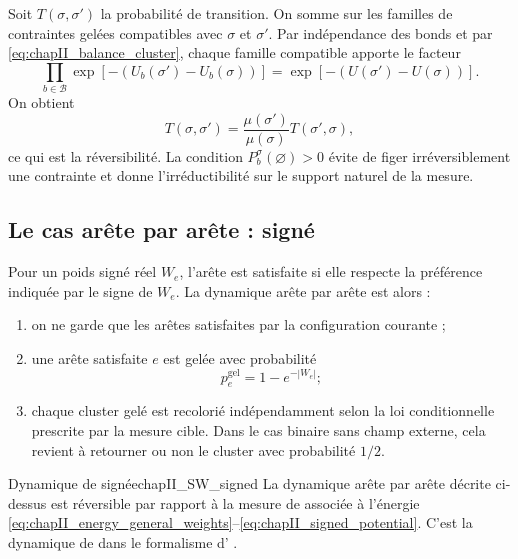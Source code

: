 \begin{Preuve}
Soit $T(\sigma,\sigma')$ la probabilité de transition. On somme sur les familles de contraintes gelées compatibles avec $\sigma$ et $\sigma'$. Par indépendance des bonds et par \eqref{eq:chapII_balance_cluster}, chaque famille compatible apporte le facteur
\[
    \prod_{b\in\mathcal B}\exp[-(U_b(\sigma')-U_b(\sigma))]
    =
    \exp[-(U(\sigma')-U(\sigma))].
\]
On obtient
\[
    T(\sigma,\sigma')=\frac{\mu(\sigma')}{\mu(\sigma)}T(\sigma',\sigma),
\]
ce qui est la réversibilité. La condition $P_b^\sigma(\varnothing)>0$ évite de figer irréversiblement une contrainte et donne l'irréductibilité sur le support naturel de la mesure.
\end{Preuve}

\subsection{Le cas arête par arête :  signé}

Pour un poids signé réel $W_e$, l'arête est satisfaite si elle respecte la préférence indiquée par le signe de $W_e$. La dynamique arête par arête est alors :
\begin{enumerate}
    \item on ne garde que les arêtes satisfaites par la configuration courante ;
    \item une arête satisfaite $e$ est gelée avec probabilité
    \begin{equation}
        p_e^{\mathrm{gel}}=1-e^{-|W_e|};
        \label{eq:chapII_freeze_edge_weight}
    \end{equation}
    \item chaque cluster gelé est recolorié indépendamment selon la loi conditionnelle prescrite par la mesure cible. Dans le cas binaire sans champ externe, cela revient à retourner ou non le cluster avec probabilité $1/2$.
\end{enumerate}

\begin{Resultat}{Dynamique de  signée}{chapII_SW_signed}
La dynamique arête par arête décrite ci-dessus est réversible par rapport à la mesure de  associée à l'énergie \eqref{eq:chapII_energy_general_weights}--\eqref{eq:chapII_signed_potential}. C'est la dynamique de \SW{} dans le formalisme d'\ES{} \cite{SwendsenWang,EdwardsSokal}.
\end{Resultat}

